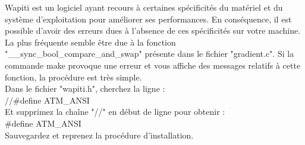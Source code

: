 \documentclass[manual-fr.tex]{subfiles}
\begin{document}
Wapiti est un logiciel ayant recours à certaines spécificités du matériel et du système d'exploitation pour améliorer ses performances. En conséquence, il est possible d'avoir des erreurs dues à l'absence de ces spécificités sur votre machine.\\

La plus fréquente semble être due à la fonction "\_\_sync\_bool\_compare\_and\_swap" présente dans le fichier "gradient.c". Si la commande make provoque une erreur et vous affiche des messages relatifs à cette fonction, la procédure est très simple.\\

Dans le fichier "wapiti.h", cherchez la ligne :\\
//\#define ATM\_ANSI\\
Et supprimez la chaîne "//" en début de ligne pour obtenir :\\
\#define ATM\_ANSI\\
Sauvegardez et reprenez la procédure d'installation.
\end{document}
